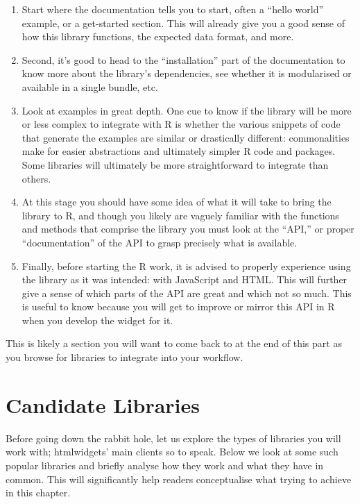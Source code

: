 \documentclass[10pt,]{krantz}
\providecommand{\tightlist}{%
  \setlength{\itemsep}{0pt}\setlength{\parskip}{0pt}}
\begin{document}
\begin{enumerate}
\def\labelenumi{\arabic{enumi}.}
\tightlist
\item
  Start where the documentation tells you to start, often a ``hello world'' example, or a get-started section. This will already give you a good sense of how this library functions, the expected data format, and more.
\item
  Second, it's good to head to the ``installation'' part of the documentation to know more about the library's dependencies, see whether it is modularised or available in a single bundle, etc.
\item
  Look at examples in great depth. One cue to know if the library will be more or less complex to integrate with R is whether the various snippets of code that generate the examples are similar or drastically different: commonalities make for easier abstractions and ultimately simpler R code and packages. Some libraries will ultimately be more straightforward to integrate than others.
\item
  At this stage you should have some idea of what it will take to bring the library to R, and though you likely are vaguely familiar with the functions and methods that comprise the library you must look at the ``API,'' or proper ``documentation'' of the API to grasp precisely what is available.
\item
  Finally, before starting the R work, it is advised to properly experience using the library as it was intended: with JavaScript and HTML. This will further give a sense of which parts of the API are great and which not so much. This is useful to know because you will get to improve or mirror this API in R when you develop the widget for it.
\end{enumerate}

This is likely a section you will want to come back to at the end of this part as you browse for libraries to integrate into your workflow.

\hypertarget{widgets-basics-candidates}{%
\section{Candidate Libraries}\label{widgets-basics-candidates}}

Before going down the rabbit hole, let us explore the types of libraries you will work with; htmlwidgets' main clients so to speak. Below we look at some such popular libraries and briefly analyse how they work and what they have in common. This will significantly help readers conceptualise what trying to achieve in this chapter.
\end{document}
